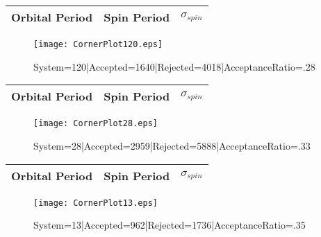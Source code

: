 \documentclass[10pt]{article}
\begin{document}
\begin{center}
        \begin{tabular}{|c|c|c|}
        \hline
Orbital Period & Spin Period & $\sigma_{spin}$ \\
 \hline
        \end{tabular}
        \end{center}
\begin{figure}[h] 
        \texttt{[image: CornerPlot120.eps]}
        \caption{System=120|Accepted=1640|Rejected=4018|AcceptanceRatio=.28}
        \label{S120}
        \centering
        \end{figure}
\begin{center}
        \begin{tabular}{|c|c|c|}
        \hline
Orbital Period & Spin Period & $\sigma_{spin}$ \\
 \hline
        \end{tabular}
        \end{center}
\begin{figure}[h] 
        \texttt{[image: CornerPlot28.eps]}
        \caption{System=28|Accepted=2959|Rejected=5888|AcceptanceRatio=.33}
        \label{S28}
        \centering
        \end{figure}
\begin{center}
        \begin{tabular}{|c|c|c|}
        \hline
Orbital Period & Spin Period & $\sigma_{spin}$ \\
 \hline
        \end{tabular}
        \end{center}
\begin{figure}[h] 
        \texttt{[image: CornerPlot13.eps]}
        \caption{System=13|Accepted=962|Rejected=1736|AcceptanceRatio=.35}
        \label{S13}
        \centering
        \end{figure}
\end{document}
